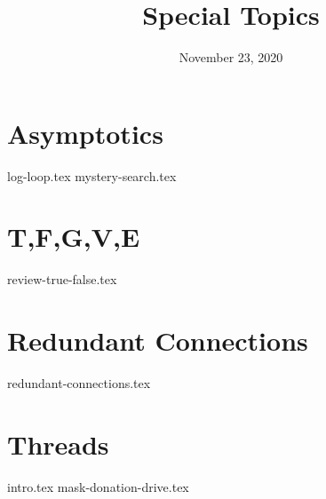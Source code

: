 \documentclass[11pt]{exam}
\title{Special Topics}
\date{November 23, 2020}
\begin{document}
\maketitle 
\section{Asymptotics}
\begin{questions}
{log-loop.tex}
{mystery-search.tex}

\end{questions}
\newpage
\section{T,F,G,V,E}
\begin{questions}
{review-true-false.tex}
\end{questions}

\pagebreak

\section{Redundant Connections} 
\begin{questions}
{redundant-connections.tex}
\end{questions}

\pagebreak

\section{Threads}
\begin{questions}
{intro.tex}
{mask-donation-drive.tex}
\end{questions}
\end{document}
